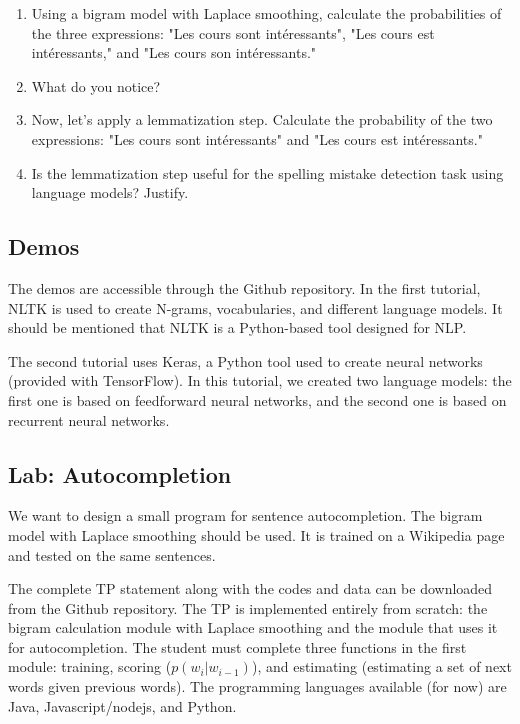 \documentclass{KBook}
\begin{document}
\begin{enumerate}
	\begin{enumerate}
		\item Using a bigram model with Laplace smoothing, calculate the probabilities of the three expressions: "Les cours sont intéressants", "Les cours est intéressants," and "Les cours son intéressants."
		\item What do you notice?
		\item Now, let's apply a lemmatization step. Calculate the probability of the two expressions: "Les cours sont intéressants" and "Les cours est intéressants."
		\item Is the lemmatization step useful for the spelling mistake detection task using language models? Justify.
	\end{enumerate}
	
\end{enumerate}

\subsection*{Demos}

The demos are accessible through the Github repository.
In the first tutorial, NLTK is used to create N-grams, vocabularies, and different language models.
It should be mentioned that NLTK is a Python-based tool designed for NLP.

The second tutorial uses Keras, a Python tool used to create neural networks (provided with TensorFlow).
In this tutorial, we created two language models: the first one is based on feedforward neural networks, and the second one is based on recurrent neural networks.

\subsection*{Lab: Autocompletion}

We want to design a small program for sentence autocompletion. The bigram model with Laplace smoothing should be used. It is trained on a Wikipedia page and tested on the same sentences.

The complete TP statement along with the codes and data can be downloaded from the Github repository.
The TP is implemented entirely from scratch: the bigram calculation module with Laplace smoothing and the module that uses it for autocompletion. The student must complete three functions in the first module: training, scoring ($p(w_i|w_{i-1})$), and estimating (estimating a set of next words given previous words).
The programming languages available (for now) are Java, Javascript/nodejs, and Python.
\end{document}
